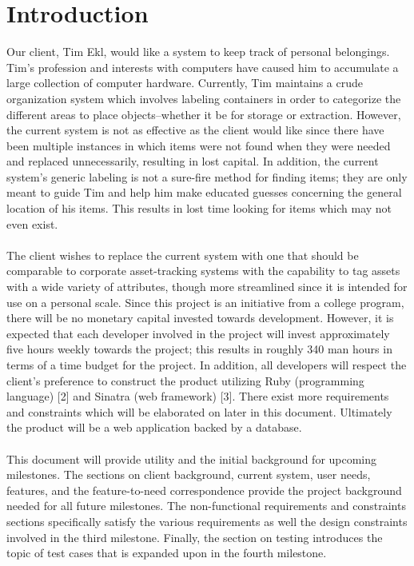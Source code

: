 \documentclass{article}
\begin{document}
\section{Introduction}
Our client, Tim Ekl, would like a system to keep track of personal belongings. Tim's profession and interests with computers have caused him to accumulate a large collection of computer hardware. Currently, Tim maintains a crude organization system which involves labeling containers in order to categorize the different areas to place objects--whether it be for storage or extraction. However, the current system is not as effective as the client would like since there have been multiple instances in which items were not found when they were needed and replaced unnecessarily, resulting in lost capital. In addition, the current system's generic labeling is not a sure-fire method for finding items; they are only meant to guide Tim and help him make educated guesses concerning the general location of his items. This results in lost time looking for items which may not even exist.\\
~\\
The client wishes to replace the current system with one that should be comparable to corporate asset-tracking systems with the capability to tag assets with a wide variety of attributes, though more streamlined since it is intended for use on a personal scale. Since this project is an initiative from a college program, there will be no monetary capital invested towards development. However, it is expected that each developer involved in the project will invest approximately five hours weekly towards the project; this results in roughly 340 man hours in terms of a time budget for the project. In addition, all developers will respect the client's preference to construct the product utilizing Ruby (programming language) [2] and Sinatra (web framework) [3]. There exist more requirements and constraints which will be elaborated on later in this document. Ultimately the product will be a web application backed by a database.\\
~\\
This document will provide utility and the initial background for upcoming milestones.  The sections on client background, current system, user needs, features, and the feature-to-need correspondence provide the project background needed for all future milestones. The non-functional requirements and constraints sections specifically satisfy the various requirements as well the design constraints involved in the third milestone.  Finally, the section on testing introduces the topic of test cases that is expanded upon in the fourth milestone.
\end{document}
